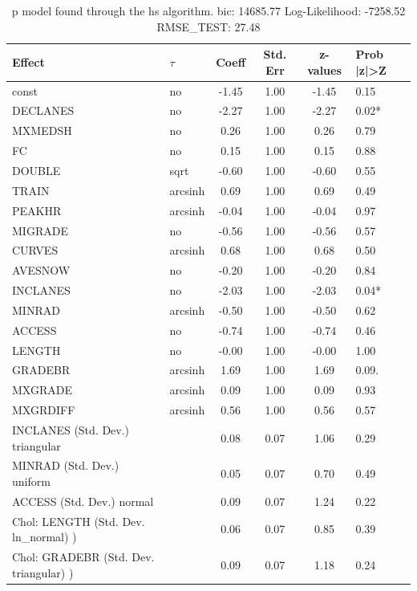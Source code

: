 \begin{table}
	\caption{p model found through the hs algorithm. bic: 14685.77 Log-Likelihood: -7258.52 RMSE_TEST: 27.48}
	\begin{center}
		\begin{tabular}{|l|l|c|c|c|l|}
			\hline
			Effect & $\tau$ & Coeff & Std. Err & z-values & Prob |z|>Z \\
			\hline
			const & no & -1.45 & 1.00 & -1.45 & 0.15 \\
			\hline
			DECLANES & no & -2.27 & 1.00 & -2.27 & 0.02* \\
			\hline
			MXMEDSH & no & 0.26 & 1.00 & 0.26 & 0.79 \\
			\hline
			FC & no & 0.15 & 1.00 & 0.15 & 0.88 \\
			\hline
			DOUBLE & sqrt & -0.60 & 1.00 & -0.60 & 0.55 \\
			\hline
			TRAIN & arcsinh & 0.69 & 1.00 & 0.69 & 0.49 \\
			\hline
			PEAKHR & arcsinh & -0.04 & 1.00 & -0.04 & 0.97 \\
			\hline
			MIGRADE & no & -0.56 & 1.00 & -0.56 & 0.57 \\
			\hline
			CURVES & arcsinh & 0.68 & 1.00 & 0.68 & 0.50 \\
			\hline
			AVESNOW & no & -0.20 & 1.00 & -0.20 & 0.84 \\
			\hline
			INCLANES & no & -2.03 & 1.00 & -2.03 & 0.04* \\
			\hline
			MINRAD & arcsinh & -0.50 & 1.00 & -0.50 & 0.62 \\
			\hline
			ACCESS & no & -0.74 & 1.00 & -0.74 & 0.46 \\
			\hline
			LENGTH & no & -0.00 & 1.00 & -0.00 & 1.00 \\
			\hline
			GRADEBR & arcsinh & 1.69 & 1.00 & 1.69 & 0.09. \\
			\hline
			MXGRADE & arcsinh & 0.09 & 1.00 & 0.09 & 0.93 \\
			\hline
			MXGRDIFF & arcsinh & 0.56 & 1.00 & 0.56 & 0.57 \\
			\hline
			INCLANES (Std. Dev.) triangular &  & 0.08 & 0.07 & 1.06 & 0.29 \\
			\hline
			MINRAD (Std. Dev.) uniform &  & 0.05 & 0.07 & 0.70 & 0.49 \\
			\hline
			ACCESS (Std. Dev.) normal &  & 0.09 & 0.07 & 1.24 & 0.22 \\
			\hline
			 Chol: LENGTH (Std. Dev. ln_normal) ) &  & 0.06 & 0.07 & 0.85 & 0.39 \\
			\hline
			 Chol: GRADEBR (Std. Dev. triangular) ) &  & 0.09 & 0.07 & 1.18 & 0.24 \\

\end{tabular}
\end{center}
\end{table}
